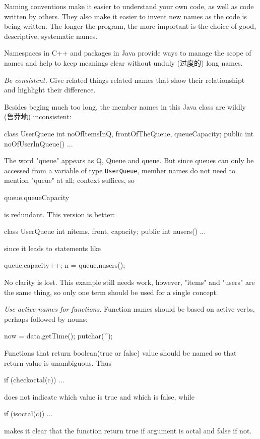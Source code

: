 Naming conventions make it easier to understand your own code, as well as
code written by others. They also make it easier to invent new names as the
code is being written. The longer the program, the more important is the
choice of good, descriptive, systematic names.

Namespaces in C++ and packages in Java provide ways to manage the scope of
names and help to keep meanings clear without unduly (过度的) long names.

\emph{Be consistent.} Give related things related names that show their
relationshipt and highlight their difference.

Besides beging much too long, the member names in this Java class are
wildly (鲁莽地) inconsistent:
\begin{badcode}
    class UserQueue {
        int noOfItemsInQ, frontOfTheQueue, queueCapacity;
        public int noOfUserInQueue() { ... }
    }
\end{badcode}
The word "queue" appears as Q, Queue and queue. But since queues can only
be accessed from a variable of type \verb"UserQueue", member names do not
need to mention "queue" at all; context suffices, so 
\begin{badcode}
    queue.queueCapacity
\end{badcode}
is redundant. This version is better:
\begin{wellcode}
    class UserQueue {
        int nitems, front, capacity;
        public int nusers() { ... }
    }
\end{wellcode}
since it leads to statements like 
\begin{wellcode}
    queue.capacity++;
    n = queue.nusers();
\end{wellcode}
No clarity is lost. This example still needs work, however, "items" and
"users" are the same thing, so only one term should be used for a single
concept.

\emph{Use active names for functions.} Function names should be based on
active verbs, perhaps followed by nouns:
\begin{wellcode}
    now = data.getTime();
    putchar('\n');
\end{wellcode}
Functions that return boolean(true or false) value should be named so that
return value is unambiguous. Thus
\begin{badcode}
    if (checkoctal(c)) ...
\end{badcode}
does not indicate which value is true and which is false, while 
\begin{wellcode}
    if (isoctal(c)) ...
\end{wellcode}
makes it clear that the function return true if argument is octal and false
if not.

